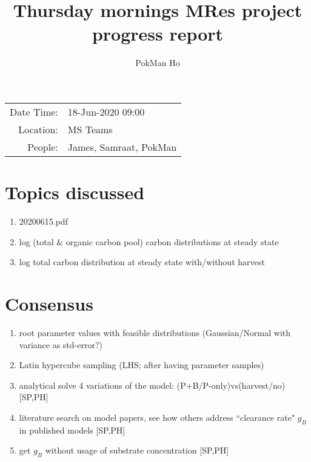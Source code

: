 \documentclass[a4paper,11pt]{article}
\title{Thursday mornings MRes project progress report}
\author{PokMan Ho}
\date{}
\begin{document}
    \maketitle
    
    \begin{tabular}{rl}
        Date Time: & 18-Jun-2020 09:00 \\
        Location: & MS Teams \\
        People: & James, Samraat, PokMan \\
    \end{tabular}
    
    \section{Topics discussed}
    \begin{enumerate}
        \item 20200615.pdf
        \item log (total \& organic carbon pool) carbon distributions at steady state
        \item log total carbon distribution at steady state with/without harvest
    \end{enumerate}
    
    \section{Consensus}
    \begin{enumerate}
        \item root parameter values with feasible distributions (Gaussian/Normal with variance as std-error?)
        \item Latin hypercube sampling (LHS; after having parameter samples)
        \item analytical solve 4 variations of the model: (P+B/P-only)vs(harvest/no) [SP,PH]
        \item literature search on model papers, see how others address ``clearance rate" $g_B$ in published models [SP,PH]
        \item get $g_B$ without usage of substrate concentration [SP,PH]
    \end{enumerate}
    
\end{document}
